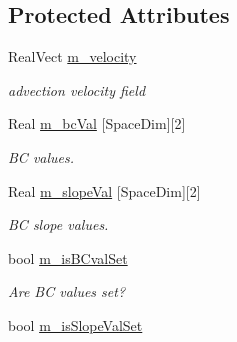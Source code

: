 \subsection*{Protected Attributes}
\begin{DoxyCompactItemize}
\item 
\hypertarget{class_vel_i_b_c_a3e9192d36c775a9b052578c5ec6a3afc}{Real\-Vect \hyperlink{class_vel_i_b_c_a3e9192d36c775a9b052578c5ec6a3afc}{m\-\_\-velocity}}\label{class_vel_i_b_c_a3e9192d36c775a9b052578c5ec6a3afc}

\begin{DoxyCompactList}\small\item\em advection velocity field \end{DoxyCompactList}\item 
\hypertarget{class_vel_i_b_c_aff3f3f8a757a0116c190cdceb78b8547}{Real \hyperlink{class_vel_i_b_c_aff3f3f8a757a0116c190cdceb78b8547}{m\-\_\-bc\-Val} \mbox{[}Space\-Dim\mbox{]}\mbox{[}2\mbox{]}}\label{class_vel_i_b_c_aff3f3f8a757a0116c190cdceb78b8547}

\begin{DoxyCompactList}\small\item\em B\-C values. \end{DoxyCompactList}\item 
\hypertarget{class_vel_i_b_c_a3cfacea013daf4121ebfbf1e2ef2b36d}{Real \hyperlink{class_vel_i_b_c_a3cfacea013daf4121ebfbf1e2ef2b36d}{m\-\_\-slope\-Val} \mbox{[}Space\-Dim\mbox{]}\mbox{[}2\mbox{]}}\label{class_vel_i_b_c_a3cfacea013daf4121ebfbf1e2ef2b36d}

\begin{DoxyCompactList}\small\item\em B\-C slope values. \end{DoxyCompactList}\item 
\hypertarget{class_vel_i_b_c_a4d82a0285b2fd37173521c2e478d5cc7}{bool \hyperlink{class_vel_i_b_c_a4d82a0285b2fd37173521c2e478d5cc7}{m\-\_\-is\-B\-Cval\-Set}}\label{class_vel_i_b_c_a4d82a0285b2fd37173521c2e478d5cc7}

\begin{DoxyCompactList}\small\item\em Are B\-C values set? \end{DoxyCompactList}\item 
\hypertarget{class_vel_i_b_c_ab2a7f49e9b7d93a22ecdffbd65516ca8}{bool \hyperlink{class_vel_i_b_c_ab2a7f49e9b7d93a22ecdffbd65516ca8}{m\-\_\-is\-Slope\-Val\-Set}}\label{class_vel_i_b_c_ab2a7f49e9b7d93a22ecdffbd65516ca8}


\end{DoxyCompactItemize}
